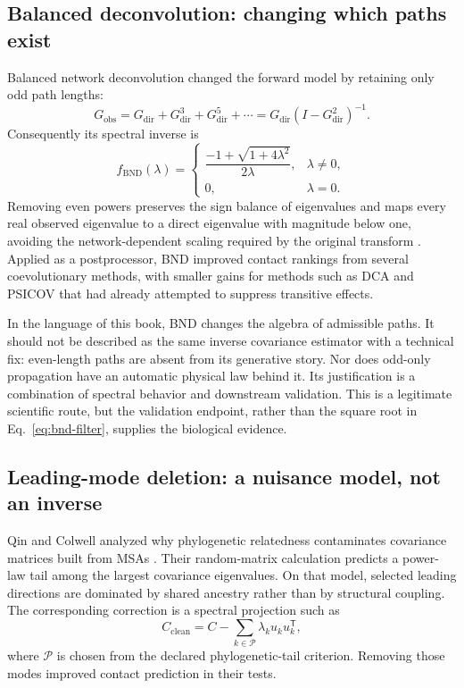 \subsection{Balanced deconvolution: changing which paths exist}

Balanced network deconvolution changed the forward model by retaining only odd path lengths:
\begin{equation}
G_{\mathrm{obs}}
=G_{\mathrm{dir}}+G_{\mathrm{dir}}^3+G_{\mathrm{dir}}^5+\cdots
=G_{\mathrm{dir}}(I-G_{\mathrm{dir}}^2)^{-1}.
\label{eq:bnd-forward}
\end{equation}
Consequently its spectral inverse is
\begin{equation}
f_{\mathrm{BND}}(\lambda)
=\begin{cases}
\dfrac{-1+\sqrt{1+4\lambda^2}}{2\lambda},&\lambda\ne0,\\[6pt]
0,&\lambda=0.
\end{cases}
\label{eq:bnd-filter}
\end{equation}
Removing even powers preserves the sign balance of eigenvalues and maps every real observed
eigenvalue to a direct eigenvalue with magnitude below one, avoiding the network-dependent scaling
required by the original transform \cite{sun2015}.  Applied as a postprocessor, BND improved
contact rankings from several coevolutionary methods, with smaller gains for methods such as DCA
and PSICOV that had already attempted to suppress transitive effects.

In the language of this book, BND changes the algebra of admissible paths.  It should not be
described as the same inverse covariance estimator with a technical fix: even-length paths are
absent from its generative story.  Nor does odd-only propagation have an automatic physical law
behind it.  Its justification is a combination of spectral behavior and downstream validation.
This is a legitimate scientific route, but the validation endpoint, rather than the square root in
Eq.~\ref{eq:bnd-filter}, supplies the biological evidence.

\subsection{Leading-mode deletion: a nuisance model, not an inverse}

Qin and Colwell analyzed why phylogenetic relatedness contaminates covariance matrices built from
MSAs \cite{qin2018}.  Their random-matrix calculation predicts a power-law tail among the largest
covariance eigenvalues.  On that model, selected leading directions are dominated by shared
ancestry rather than by structural coupling.  The corresponding correction is a spectral
projection such as
\begin{equation}
C_{\mathrm{clean}}
=C-\sum_{k\in\mathcal P}\lambda_k u_ku_k^{\mathsf T},
\label{eq:colwell-leading-mode-deletion}
\end{equation}
where $\mathcal P$ is chosen from the declared phylogenetic-tail criterion.  Removing those modes
improved contact prediction in their tests.

